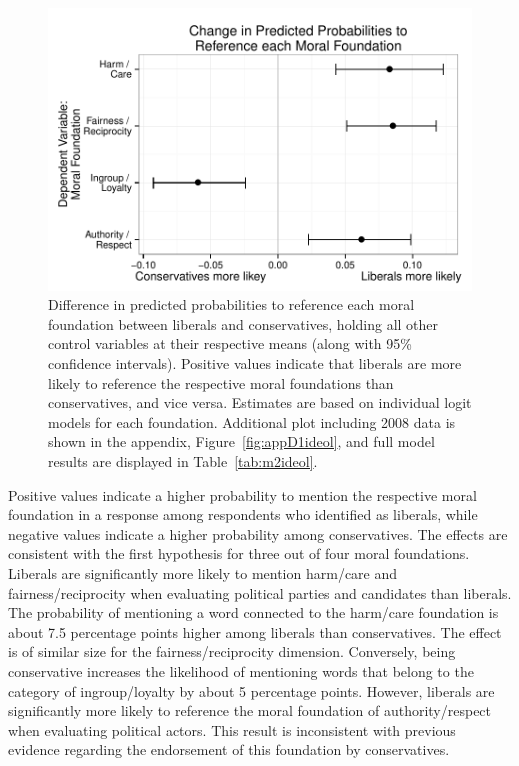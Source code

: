 \documentclass[12pt]{article}
\begin{document}
\begin{figure}[h]\centering
\includegraphics[scale=.9]{../calc/fig/fig2ideol.pdf}
\caption{Difference in predicted probabilities to reference each moral foundation between liberals and conservatives, holding all other control variables at their respective means (along with 95\% confidence intervals). Positive values indicate that liberals are more likely to reference the respective moral foundations than conservatives, and vice versa. Estimates are based on individual logit models for each foundation. Additional plot including 2008 data is shown in the appendix, Figure~\ref{fig:appD1ideol}, and full model results are displayed in Table~\ref{tab:m2ideol}.}\label{fig:2ideol}
\end{figure}

Positive values indicate a higher probability to mention the respective moral foundation in a response among respondents who identified as liberals, while negative values indicate a higher probability among conservatives. The effects are consistent with the first hypothesis for three out of four moral foundations. Liberals are significantly more likely to mention harm/care and fairness/reciprocity when evaluating political parties and candidates than liberals. The probability of mentioning a word connected to the harm/care foundation is about 7.5 percentage points higher among liberals than conservatives. The effect is of similar size for the fairness/reciprocity dimension. Conversely, being conservative increases the likelihood of mentioning words that belong to the category of ingroup/loyalty by about 5 percentage points. However, liberals are significantly more likely to reference the moral foundation of authority/respect when evaluating political actors. This result is inconsistent with previous evidence regarding the endorsement of this foundation by conservatives. 
\end{document}
